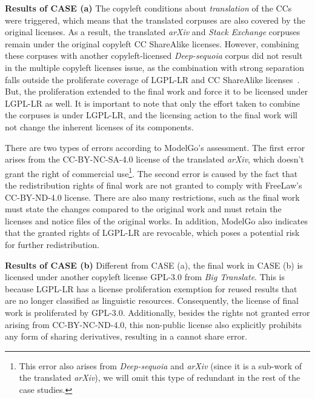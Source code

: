\textbf{Results of CASE  (a)}
The copyleft conditions about \textit{translation} of the CCs were triggered, which means that the translated corpuses are also covered by the original licenses.
As a result, the translated \textit{arXiv} and \textit{Stack Exchange} corpuses remain under the original copyleft CC ShareAlike licenses. 
However, combining these corpuses with another copyleft-licensed \textit{Deep-sequoia} corpus did not result in the multiple copyleft licenses issue, as the combination with strong separation falls outside the proliferate coverage of LGPL-LR and CC ShareAlike licenses~\cite{creative2023artificial}.
But, the proliferation extended to the final work and force it to be licensed under LGPL-LR as well.
It is important to note that only the effort taken to combine the corpuses is under LGPL-LR, and the licensing action to the final work will not change the inherent licenses of its components.

There are two types of errors according to ModelGo's assessment.
The first error arises from the CC-BY-NC-SA-4.0 license of the translated \textit{arXiv}, which doesn't grant the right of commercial use\footnote{This error also arises from \textit{Deep-sequoia} and \textit{arXiv} (since it is a sub-work of the translated \textit{arXiv}), we will omit this type of redundant in the rest of the case studies.}. 
The second error is caused by the fact that the redistribution rights of final work are not granted to comply with FreeLaw's CC-BY-ND-4.0 license.
There are also many restrictions, such as the final work must state the changes compared to the original work and must retain the licenses and notice files of the original works.
In addition, ModelGo also indicates that the granted rights of LGPL-LR are revocable, which poses a potential risk for further redistribution.

\textbf{Results of CASE  (b)} 
Different from CASE  (a), the final work in CASE  (b) is licensed under another copyleft license GPL-3.0 from \textit{Big Translate}.
This is because LGPL-LR has a license proliferation exemption for reused results that are no longer classified as linguistic resources.
Consequently, the license of final work is proliferated by GPL-3.0.
Additionally, besides the rights not granted error arising from CC-BY-NC-ND-4.0, this non-public license also explicitly prohibits any form of sharing derivatives, resulting in a cannot share error.

